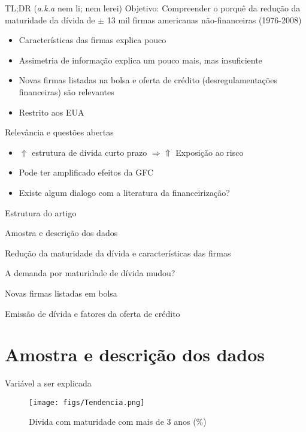 \documentclass[presentation]{beamer}
\begin{document}
\begin{frame}[label={sec:orga30b545}]{TL;DR (\emph{a.k.a} nem li; nem lerei)}
\alert{Objetivo:} Compreender o porquê da redução da maturidade da dívida de \(\pm\) 13 mil firmas americanas não-financeiras (1976-2008)
\begin{itemize}
\item Características das firmas explica pouco
\item Assimetria de informação explica um pouco mais, mas insuficiente
\item Novas firmas listadas na bolsa e oferta de crédito (desregulamentações financeiras) são relevantes
\item Restrito aos EUA
\end{itemize}


\begin{block}{Relevância e questões abertas}
\begin{itemize}
\item \(\Uparrow\) estrutura de dívida  curto prazo \(\Rightarrow \Uparrow\) Exposição ao risco
\item Pode ter amplificado efeitos da GFC
\item Existe algum dialogo com a literatura da financeirização?
\end{itemize}
\end{block}
\end{frame}


\begin{frame}[label={sec:orgeb73582}]{Estrutura do artigo}
\begin{block}{Amostra e descrição dos dados}
\end{block}
\begin{block}{Redução da maturidade da dívida e características das firmas}
\end{block}
\begin{block}{A demanda por maturidade de dívida mudou?}
\end{block}
\begin{block}{Novas firmas listadas em bolsa}
\end{block}
\begin{block}{Emissão de dívida e fatores da oferta de crédito}
\end{block}
\end{frame}
\section{Amostra e descrição dos dados}
\label{sec:org4840727}
\begin{frame}[label={sec:org85b7415}]{Variável a ser explicada}
\begin{figure}[htbp]
\caption{Dívida com maturidade com mais de 3 anos (\%)}
\centerline{\texttt{[image: figs/Tendencia.png]}}
\end{figure}
\end{frame}
\end{document}
